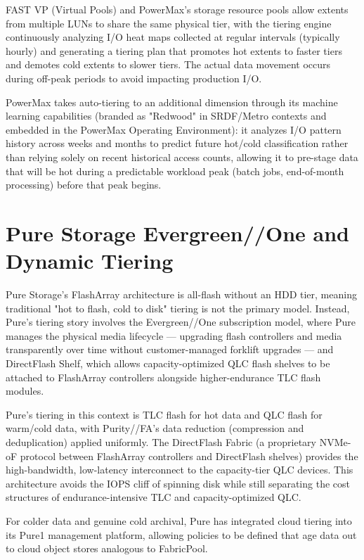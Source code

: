 FAST VP (Virtual Pools) and PowerMax's storage resource pools allow extents from multiple LUNs to share the same physical tier, with the tiering engine continuously analyzing I/O heat maps collected at regular intervals (typically hourly) and generating a tiering plan that promotes hot extents to faster tiers and demotes cold extents to slower tiers. The actual data movement occurs during off-peak periods to avoid impacting production I/O.

PowerMax takes auto-tiering to an additional dimension through its machine learning capabilities (branded as "Redwood" in SRDF/Metro contexts and embedded in the PowerMax Operating Environment): it analyzes I/O pattern history across weeks and months to predict future hot/cold classification rather than relying solely on recent historical access counts, allowing it to pre-stage data that will be hot during a predictable workload peak (batch jobs, end-of-month processing) before that peak begins.

\section{Pure Storage Evergreen//One and Dynamic Tiering}
Pure Storage's FlashArray architecture is all-flash without an HDD tier, meaning traditional "hot to flash, cold to disk" tiering is not the primary model. Instead, Pure's tiering story involves the Evergreen//One subscription model, where Pure manages the physical media lifecycle --- upgrading flash controllers and media transparently over time without customer-managed forklift upgrades --- and DirectFlash Shelf, which allows capacity-optimized QLC flash shelves to be attached to FlashArray controllers alongside higher-endurance TLC flash modules.

Pure's tiering in this context is TLC flash for hot data and QLC flash for warm/cold data, with Purity//FA's data reduction (compression and deduplication) applied uniformly. The DirectFlash Fabric (a proprietary NVMe-oF protocol between FlashArray controllers and DirectFlash shelves) provides the high-bandwidth, low-latency interconnect to the capacity-tier QLC devices. This architecture avoids the IOPS cliff of spinning disk while still separating the cost structures of endurance-intensive TLC and capacity-optimized QLC.

For colder data and genuine cold archival, Pure has integrated cloud tiering into its Pure1 management platform, allowing policies to be defined that age data out to cloud object stores analogous to FabricPool.

